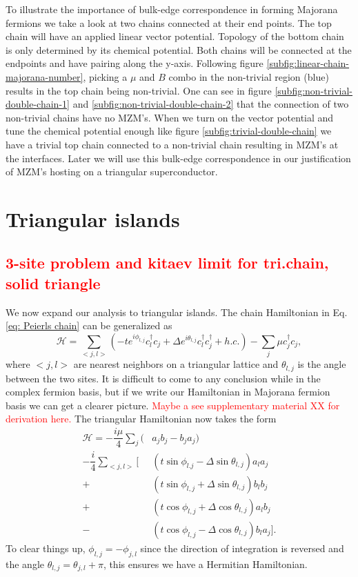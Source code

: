 \documentclass[aps,prb,showpacs,amsmath,amssymb,superscriptaddress]{revtex4-2}
\newcommand{\Red}[1]{\textcolor{red}{#1}}
\newcommand{\Ham}{\mathcal{H}}
\newcommand{\cc}{c^{\dagger}}
\newcommand{\de}{\Delta}
\begin{document}
To illustrate the importance of bulk-edge correspondence in forming Majorana fermions we take a look at two chains connected at their end points.
The top chain will have an applied linear vector potential.
Topology of the bottom chain is only determined by its chemical potential.
Both chains will be connected at the endpoints and have pairing along the y-axis.
Following figure \ref{subfig:linear-chain-majorana-number}, picking a $\mu$ and $B$ combo in the non-trivial region (blue) results in the top chain being non-trivial.
One can see in figure \ref{subfig:non-trivial-double-chain-1} and \ref{subfig:non-trivial-double-chain-2} that the connection of two non-trivial chains have no MZM's.
When we turn on the vector potential and tune the chemical potential enough like figure \ref{subfig:trivial-double-chain} we have a trivial top chain connected to a non-trivial chain resulting in MZM's at the interfaces.
Later we will use this bulk-edge correspondence in our justification of MZM's hosting on a triangular superconductor.

\section{Triangular islands}

\subsection{\Red{3-site problem and kitaev limit for tri.chain, solid triangle}}
We now expand our analysis to triangular islands.
The chain Hamiltonian in Eq. \ref{eq: Peierls chain} can be generalized as
\begin{equation} \label{eq: Peierls triangle}
  \Ham = \sum_{<j,l>} (-t e^{i\phi_{l,j}} \cc_{l} c_j + \de e^{i\theta_{l,j}} \cc_{l}\cc_j + h.c.) - \sum_j \mu \cc_j c_j,
\end{equation}
where $<j,l>$ are nearest neighbors on a triangular lattice and $\theta_{l,j}$ is the angle between the two sites.
It is difficult to come to any conclusion while in the complex fermion basis, but if we write our Hamiltonian in Majorana fermion basis we can get a clearer picture.
\Red{Maybe a see supplementary material XX for derivation here.}
The triangular Hamiltonian now takes the form
\begin{align}
  \Ham = -\dfrac{i\mu}{4} \sum_j (& a_j b_j - b_j a_j) \nonumber \\
  -\dfrac{i}{4} \sum_{<j,l>} [&(t\sin\phi_{l.j}-\de\sin\theta_{l,j}) a_l a_j \nonumber \\
  +&(t\sin\phi_{l,j}+\de\sin\theta_{l,j}) b_l b_j \nonumber \\
  +&(t\cos\phi_{l,j}+\de\cos\theta_{l,j}) a_l b_j \nonumber \\
  -&(t\cos\phi_{l,j}-\de\cos\theta_{l,j}) b_l a_j].
\end{align}
To clear things up, $\phi_{l,j} = -\phi_{j,l}$ since the direction of integration is reversed and the angle $\theta_{l,j} = \theta_{j,l} + \pi$, this ensures we have a Hermitian Hamiltonian.
\end{document}
